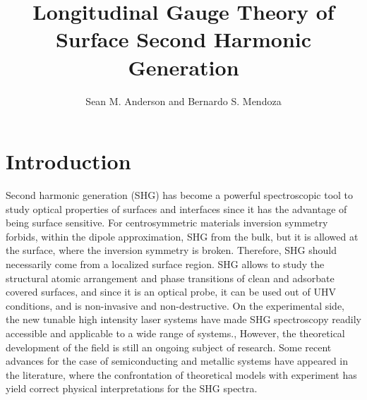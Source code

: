 \documentclass[floatfix,prb,aps,superscriptaddress,11pt,preprint]{revtex4}
\begin{document}
\title{Longitudinal Gauge Theory of Surface Second Harmonic Generation}
\author{Sean M. Anderson and Bernardo S. Mendoza}



\maketitle
\tableofcontents

\section{Introduction}\label{intro}

Second harmonic generation (SHG) has become a powerful spectroscopic  tool to study optical properties of surfaces and interfaces since it has the advantage of being surface sensitive. For centrosymmetric materials inversion symmetry forbids, within the dipole approximation, SHG from the bulk, but it is allowed at the surface, where the inversion symmetry is broken. Therefore, SHG should necessarily come from a localized surface region. SHG allows to study the structural atomic arrangement and phase transitions of clean and adsorbate covered surfaces, and since it is an optical probe, it can be used out of UHV conditions, and is non-invasive and non-destructive. On the experimental side, the new tunable high intensity laser systems have made SHG spectroscopy readily accessible and applicable to a wide range of systems.\cite{downer_optical_2001},\cite{lupke_characterization_1999} However, the theoretical development of the field is still an ongoing subject of research. Some recent advances for the case of semiconducting and metallic systems have appeared in the literature, where the confrontation of theoretical
models with experiment has yield correct physical interpretations for the SHG spectra.\cite{downer_optical_2001,mendoza_ab_2001,lim_optical_2000,gavrilenko_optical_2000,mendoza_visible-infrared_1999,mendoza_microscopic_1998,mendoza_local-field_1996,mendoza_polarizable-bond_1997,guyot-sionnest_electronic_1990}
\end{document}
